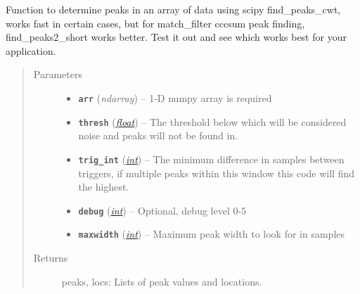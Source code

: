 \documentclass[a4paper,10pt,english]{sphinxmanual}
\begin{document}
\begin{fulllineitems}
\label{utils:findpeaks.find_peaks2}
Function to determine peaks in an array of data using scipy find\_peaks\_cwt,
works fast in certain cases, but for match\_filter cccsum peak finding,
find\_peaks2\_short works better.  Test it out and see which works best for
your application.
\begin{quote}\begin{description}
\item[{Parameters}] \leavevmode\begin{itemize}
\item {} 
\textbf{\texttt{arr}} (\emph{ndarray}) -- 1-D numpy array is required

\item {} 
\textbf{\texttt{thresh}} (\href{https://docs.python.org/library/functions.html\#float}{\emph{float}}) -- The threshold below which will be considered noise and peaks    will not be found in.

\item {} 
\textbf{\texttt{trig\_int}} (\href{https://docs.python.org/library/functions.html\#int}{\emph{int}}) -- The minimum difference in samples between triggers,    if multiple peaks within this window this code will find the highest.

\item {} 
\textbf{\texttt{debug}} (\href{https://docs.python.org/library/functions.html\#int}{\emph{int}}) -- Optional, debug level 0-5

\item {} 
\textbf{\texttt{maxwidth}} (\href{https://docs.python.org/library/functions.html\#int}{\emph{int}}) -- Maximum peak width to look for in samples

\end{itemize}

\item[{Returns}] \leavevmode
peaks, locs: Lists of peak values and locations.

\end{description}\end{quote}

\end{fulllineitems}

\end{document}
